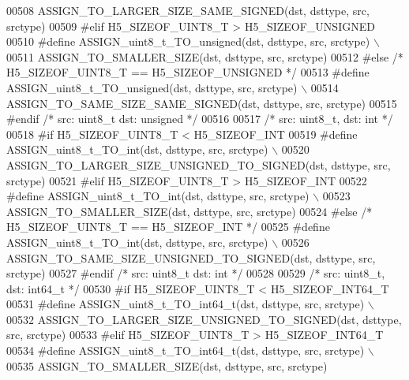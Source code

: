 \begin{DoxyCode}
00508 \textcolor{preprocessor}{        ASSIGN\_TO\_LARGER\_SIZE\_SAME\_SIGNED(dst, dsttype, src, srctype)}
00509 \textcolor{preprocessor}{#elif H5\_SIZEOF\_UINT8\_T > H5\_SIZEOF\_UNSIGNED}
00510 \textcolor{preprocessor}{    #define ASSIGN\_uint8\_t\_TO\_unsigned(dst, dsttype, src, srctype) \(\backslash\)}
00511 \textcolor{preprocessor}{        ASSIGN\_TO\_SMALLER\_SIZE(dst, dsttype, src, srctype)}
00512 \textcolor{preprocessor}{#else }\textcolor{comment}{/* H5\_SIZEOF\_UINT8\_T == H5\_SIZEOF\_UNSIGNED */}\textcolor{preprocessor}{}
00513 \textcolor{preprocessor}{    #define ASSIGN\_uint8\_t\_TO\_unsigned(dst, dsttype, src, srctype) \(\backslash\)}
00514 \textcolor{preprocessor}{        ASSIGN\_TO\_SAME\_SIZE\_SAME\_SIGNED(dst, dsttype, src, srctype)}
00515 \textcolor{preprocessor}{#endif }\textcolor{comment}{/* src: uint8\_t dst: unsigned */}\textcolor{preprocessor}{}
00516 
00517 \textcolor{comment}{/* src: uint8\_t, dst: int */}
00518 \textcolor{preprocessor}{#if H5\_SIZEOF\_UINT8\_T < H5\_SIZEOF\_INT}
00519 \textcolor{preprocessor}{    #define ASSIGN\_uint8\_t\_TO\_int(dst, dsttype, src, srctype) \(\backslash\)}
00520 \textcolor{preprocessor}{        ASSIGN\_TO\_LARGER\_SIZE\_UNSIGNED\_TO\_SIGNED(dst, dsttype, src, srctype)}
00521 \textcolor{preprocessor}{#elif H5\_SIZEOF\_UINT8\_T > H5\_SIZEOF\_INT}
00522 \textcolor{preprocessor}{    #define ASSIGN\_uint8\_t\_TO\_int(dst, dsttype, src, srctype) \(\backslash\)}
00523 \textcolor{preprocessor}{        ASSIGN\_TO\_SMALLER\_SIZE(dst, dsttype, src, srctype)}
00524 \textcolor{preprocessor}{#else }\textcolor{comment}{/* H5\_SIZEOF\_UINT8\_T == H5\_SIZEOF\_INT */}\textcolor{preprocessor}{}
00525 \textcolor{preprocessor}{    #define ASSIGN\_uint8\_t\_TO\_int(dst, dsttype, src, srctype) \(\backslash\)}
00526 \textcolor{preprocessor}{        ASSIGN\_TO\_SAME\_SIZE\_UNSIGNED\_TO\_SIGNED(dst, dsttype, src, srctype)}
00527 \textcolor{preprocessor}{#endif }\textcolor{comment}{/* src: uint8\_t dst: int */}\textcolor{preprocessor}{}
00528 
00529 \textcolor{comment}{/* src: uint8\_t, dst: int64\_t */}
00530 \textcolor{preprocessor}{#if H5\_SIZEOF\_UINT8\_T < H5\_SIZEOF\_INT64\_T}
00531 \textcolor{preprocessor}{    #define ASSIGN\_uint8\_t\_TO\_int64\_t(dst, dsttype, src, srctype) \(\backslash\)}
00532 \textcolor{preprocessor}{        ASSIGN\_TO\_LARGER\_SIZE\_UNSIGNED\_TO\_SIGNED(dst, dsttype, src, srctype)}
00533 \textcolor{preprocessor}{#elif H5\_SIZEOF\_UINT8\_T > H5\_SIZEOF\_INT64\_T}
00534 \textcolor{preprocessor}{    #define ASSIGN\_uint8\_t\_TO\_int64\_t(dst, dsttype, src, srctype) \(\backslash\)}
00535 \textcolor{preprocessor}{        ASSIGN\_TO\_SMALLER\_SIZE(dst, dsttype, src, srctype)}

\end{DoxyCode}
